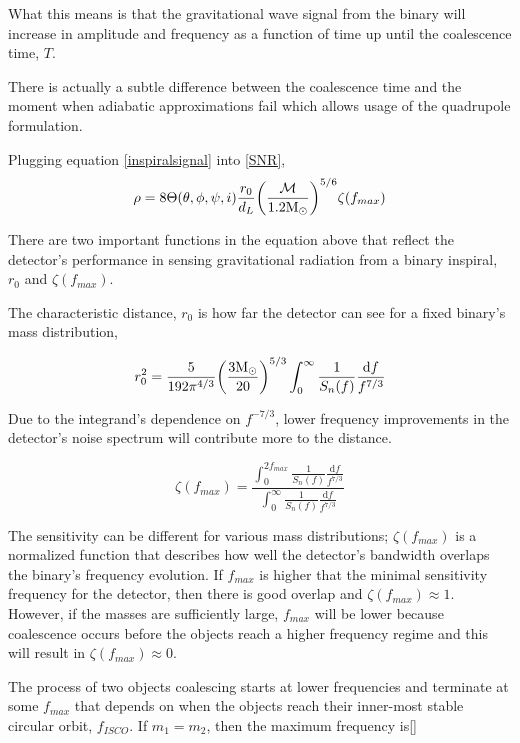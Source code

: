 	What this means is that the gravitational wave signal from the binary will increase in amplitude and frequency as a function of time up until the coalescence time, $T$.


	There is actually a subtle difference between the coalescence time and the moment when adiabatic approximations fail which allows usage of the quadrupole formulation. 

	Plugging equation \ref{inspiralsignal} into \ref{SNR},
	\begin{equation}
	\rho = 8 \Theta(\theta,\phi,\psi,i) \frac{r_0}{d_L} \bigg(\frac{\mathcal{M}}{1.2 \textup{M}_\odot}\bigg)^{5/6} \zeta(f_{max})
	\end{equation}
	
	There are two important functions in the equation above that reflect the detector's performance in sensing gravitational radiation from a binary inspiral, $r_0$ and $\zeta(f_{max})$.
	
	The characteristic distance, $r_0$ is how far the detector can see for a fixed binary's mass distribution,
	
	\begin{equation}\label{char_r0}
	r_0^2 = \frac{5}{192\pi^{4/3}} \bigg(\frac{3\textup{M}_\odot}{20}\bigg)^{5/3}   \int_{0}^{\infty} \frac{1}{S_n(f)} \frac{\text{d} f}{f^{7/3}}
	\end{equation}

	Due to the integrand's dependence on $f^{-7/3}$, lower frequency improvements in the detector's noise spectrum will contribute more to the distance.
	
	\begin{equation}\label{zeta}
	\zeta(f_{max}) = \frac{\int_{0}^{2f_{max}} \frac{1}{S_n(f)} \frac{\text{d} f}{f^{7/3}}}{\int_{0}^{\infty} \frac{1}{S_n(f)} \frac{\text{d} f}{f^{7/3}}}
	\end{equation}
	
	The sensitivity can be different for various mass distributions; $\zeta(f_{max})$ is a normalized function that describes how well the detector's bandwidth overlaps the binary's frequency evolution.  If $f_{max}$ is higher that the minimal sensitivity frequency for the detector, then there is good overlap and  $\zeta(f_{max})\approx 1$.  However, if the masses are sufficiently large, $f_{max}$ will be lower because coalescence occurs before the objects reach a higher frequency regime and this will result in  $\zeta(f_{max})\approx 0$.
	
	The process of two objects coalescing starts at lower frequencies and terminate at some $f_{max}$ that depends on when the objects reach their inner-most stable circular orbit, $f_{ISCO}$.   If $m_1=m_2$, then the maximum frequency is[]
	
